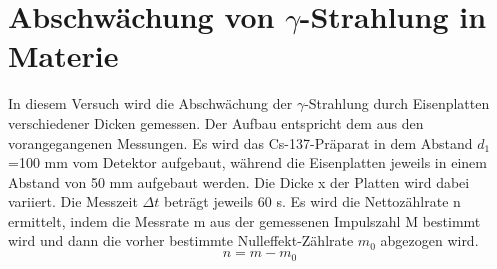 \documentclass[../protokoll.tex]{subfiles}
\begin{document}
\section{Abschwächung von $\gamma$-Strahlung in Materie}\label{sec:Abschwächung Gamma-Strahlung}
In diesem Versuch wird die Abschwächung der $\gamma$-Strahlung durch Eisenplatten verschiedener Dicken gemessen. Der Aufbau entspricht dem aus den vorangegangenen Messungen. Es wird das Cs-137-Präparat in dem Abstand $d_1$=100 mm vom Detektor aufgebaut, während die Eisenplatten jeweils in einem Abstand von 50 mm aufgebaut werden. Die Dicke x der Platten wird dabei variiert. Die Messzeit $\Delta t$ beträgt jeweils 60 s. Es wird die Nettozählrate n ermittelt, indem die Messrate m aus der gemessenen Impulszahl M bestimmt wird und dann die vorher bestimmte Nulleffekt-Zählrate $m_0$ abgezogen wird.
\begin{equation}
        n=m-m_0
\end{equation}
\end{document}
